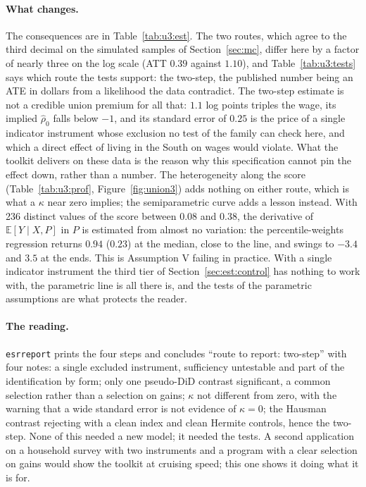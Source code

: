 \documentclass[11pt,a4paper]{article}
\theoremstyle{plain}
\theoremstyle{definition}
\theoremstyle{remark}
\newcommand{\E}{\mathbb{E}}
\newcommand{\1}{\mathbf{1}}
\newcommand{\cmd}[1]{\texttt{#1}}
\begin{document}
\paragraph{What changes.}
The consequences are in Table~\ref{tab:u3:est}. The two routes, which
agree to the third decimal on the simulated samples of
Section~\ref{sec:mc}, differ here by a factor of nearly three on the
log scale (ATT $0.39$ against $1.10$), and Table~\ref{tab:u3:tests}
says which route the tests support: the two-step, the published number
being an ATE in dollars from a likelihood the data contradict. The
two-step estimate is not a credible union premium for all that: $1.1$
log points triples the wage, its implied $\hat\rho_0$ falls below $-1$,
and its standard error of $0.25$ is the price of a single indicator
instrument whose exclusion no test of the family can check here, and
which a direct effect of living in the South on wages would violate.
What the toolkit delivers on these data is the reason why this
specification cannot pin the effect down, rather than a number. The
heterogeneity along the score (Table~\ref{tab:u3:prof},
Figure~\ref{fig:union3}) adds nothing on either route, which is what a
$\kappa$ near zero implies; the semiparametric curve adds a lesson
instead. With 236 distinct values of the score between $0.08$ and
$0.38$, the derivative of $\E[Y\mid X,P]$ in $P$ is estimated from
almost no variation: the percentile-weights regression returns $0.94$
($0.23$) at the median, close to the line, and swings to $-3.4$ and
$3.5$ at the ends. This is Assumption V failing in practice. With a
single indicator instrument the third tier of
Section~\ref{sec:est:control} has nothing to work with, the parametric
line is all there is, and the tests of the parametric assumptions are
what protects the reader.

\paragraph{The reading.}
\cmd{esrreport} prints the four steps and concludes ``route to report:
two-step'' with four notes: a single excluded instrument, sufficiency
untestable and part of the identification by form; only one
pseudo-DiD contrast significant, a common selection rather than a
selection on gains; $\kappa$ not different from zero, with the warning
that a wide standard error is not evidence of $\kappa=0$; the Hausman
contrast rejecting with a clean index and clean Hermite controls, hence
the two-step. None of this needed a new model; it needed the tests. A
second application on a household survey with two instruments and a
program with a clear selection on gains would show the toolkit at
cruising speed; this one shows it doing what it is for.
\end{document}
